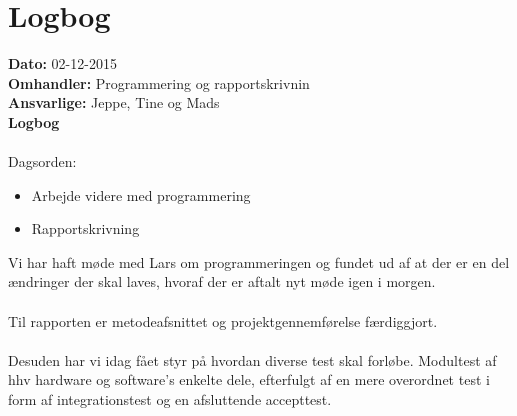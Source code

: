\section{Logbog}

\textbf{Dato:} 02-12-2015\\
\textbf{Omhandler:} Programmering og rapportskrivnin\\
\textbf{Ansvarlige:} Jeppe, Tine og Mads\\
\textbf{Logbog}
\\
\\
Dagsorden:
\begin{itemize}
	\item Arbejde videre med programmering
	\item Rapportskrivning
\end{itemize}
Vi har haft møde med Lars om programmeringen og fundet ud af at der er en del ændringer der skal laves, hvoraf der er aftalt nyt møde igen i morgen.
\\
\\
Til rapporten er metodeafsnittet og projektgennemførelse færdiggjort.\\ \\
Desuden har vi idag fået styr på hvordan diverse test skal forløbe. Modultest af hhv hardware og software's enkelte dele, efterfulgt af en mere overordnet test i form af integrationstest og en afsluttende accepttest.